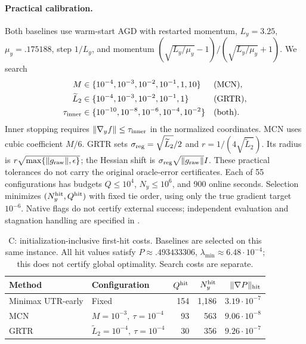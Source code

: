 \paragraph{Practical calibration.}
Both baselines use warm-start AGD with restarted momentum,
$L_y=3.25$, $\mu_y=.175188$, step $1/L_y$, and momentum
$(\sqrt{L_y/\mu_y}-1)/(\sqrt{L_y/\mu_y}+1)$. We search
\begin{equation}
\begin{aligned}
 M&\in\{10^{-4},10^{-3},10^{-2},10^{-1},1,10\} &&\text{(MCN)},\\
 \widetilde L_2&\in\{10^{-4},10^{-3},10^{-2},10^{-1},1\} &&\text{(GRTR)},\\
 \tau_{\rm inner}&\in\{10^{-10},10^{-8},10^{-6},10^{-4},10^{-2}\}
                                                       &&\text{(both)}.
\end{aligned}
\label{eq:exp-c-grid}
\end{equation}
Inner stopping requires $\|\nabla_y f\|\le\tau_{\rm inner}$ in the
normalized coordinates. MCN uses cubic coefficient $M/6$. GRTR sets
$\sigma_{\rm reg}=\sqrt{\widetilde L_2}/2$ and
$r=1/(4\sqrt{\widetilde L_2})$. Its radius is
$r\sqrt{\max\{\|g_{\rm raw}\|,\epsilon\}}$; the Hessian shift is
$\sigma_{\rm reg}\sqrt{\|g_{\rm raw}\|}I$.
These practical tolerances do not carry the original oracle-error
certificates. Each of 55 configurations has budgets $Q\le10^4$,
$N_y\le10^6$, and 900 online seconds. Selection minimizes
$(N_y^{\rm hit},Q^{\rm hit})$ with fixed tie order, using only the true
gradient target $10^{-6}$. Native flags do not certify external success;
independent evaluation and stagnation handling are specified in
.

\begin{table}[tb]
\centering\small
\setlength{\tabcolsep}{5pt}
\begin{tabular}{llrrr}
\toprule
Method & Configuration & $Q^{\rm hit}$ & $N_y^{\rm hit}$ & $\|\nabla P\|_{\rm hit}$\\
\midrule
Minimax UTR-early & Fixed & 154 & 1,186 & $3.19\cdot10^{-7}$\\
MCN & $M=10^{-3},\ \tau=10^{-4}$ & 93 & 563 & $9.06\cdot10^{-8}$\\
GRTR & $\widetilde L_2=10^{-4},\ \tau=10^{-4}$ & 30 & 356 & $9.26\cdot10^{-7}$\\
\bottomrule
\end{tabular}
\caption{C: initialization-inclusive first-hit costs. Baselines are
selected on this same instance. All hit values satisfy
$P\approx.493433306$, $\lambda_{\min}\approx6.48\cdot10^{-4}$;
this does not certify global optimality. Search costs are separate.}
\label{tab:exp-c-hits}
\end{table}

